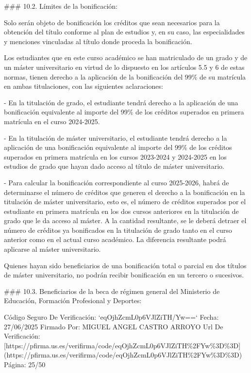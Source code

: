 \documentclass{article}
\begin{document}
\begin{itemize}
\begin{itemize}
\begin{scriptsize}
                  \#\#\# 10.2. Límites de la bonificación:

                  Solo serán objeto de bonificación los créditos que sean necesarios para la obtención del título conforme al plan de estudios y, en su caso, las especialidades y menciones vinculadas al título donde proceda la bonificación.

                  Los estudiantes que en este curso académico se han matriculado de un grado y de un máster universitario en virtud de lo dispuesto en los artículos 5.5 y 6 de estas normas, tienen derecho a la aplicación de la bonificación del 99\% de su matrícula en ambas titulaciones, con las siguientes aclaraciones:

                  - En la titulación de grado, el estudiante tendrá derecho a la aplicación de una bonificación equivalente al importe del 99\% de los créditos superados en primera matrícula en el curso 2024-2025.

                  - En la titulación de máster universitario, el estudiante tendrá derecho a la aplicación de una bonificación equivalente al importe del 99\% de los créditos superados en primera matrícula en los cursos 2023-2024 y 2024-2025 en los estudios de grado que hayan dado acceso al título de máster universitario.

                  - Para calcular la bonificación correspondiente al curso 2025-2026, habrá de determinarse el número de créditos que generen el derecho a la bonificación en la titulación de máster universitario, esto es, el número de créditos superados por el estudiante en primera matrícula en los dos cursos anteriores en la titulación de grado que le da acceso al máster. A la cantidad resultante, se le deberá detraer el número de créditos ya bonificados en la titulación de grado tanto en el curso anterior como en el actual curso académico. La diferencia resultante podrá aplicarse al máster universitario.

                  Quienes hayan sido beneficiarios de una bonificación total o parcial en dos títulos de máster universitario, no podrán recibir bonificación en un tercero o sucesivos.

                  \#\#\# 10.3. Beneficiarios de la beca de régimen general del Ministerio de Educación, Formación Profesional y Deportes:

                  Código Seguro De Verificación: `eqOjhZcmL0p6VJlZiTH/Yw==`
                  Fecha: 27/06/2025
                  Firmado Por: MIGUEL ANGEL CASTRO ARROYO
                  Url De Verificación: [https://pfirma.us.es/verifirma/code/eqOjhZcmL0p6VJlZiTH\%2FYw\%3D\%3D](https://pfirma.us.es/verifirma/code/eqOjhZcmL0p6VJlZiTH\%2FYw\%3D\%3D)
                  Página: 25/50


\end{scriptsize}
\end{itemize}
\end{itemize}
\end{document}
